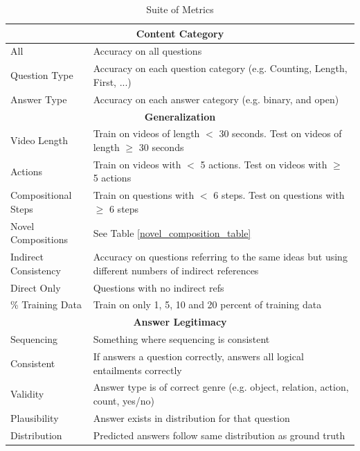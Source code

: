\documentclass[10pt,twocolumn,letterpaper]{article}
\begin{document}
\begin{table}[]
    \begin{center}
    \caption{Suite of Metrics}
    \label{metrics}
    \begin{tabular}{|p{2cm}|p{5cm}|}
     \hline
     \multicolumn{2}{|c|}{\textbf{Content Category}}\\
    \hline
    All & Accuracy on all questions\\
    \hline
    Question Type & Accuracy on each question category (e.g. Counting, Length, First, ...)\\
    \hline
    Answer Type & Accuracy on each answer category (e.g. binary, and open)\\
    \hline
    
    
     \multicolumn{2}{|c|}{\textbf{Generalization}}\\
    \hline
    Video Length & Train on videos of length $<$ 30 seconds. Test on videos of length $\geq$ 30 seconds \\
    \hline
    Actions & Train on videos with $<$ 5 actions. Test on videos with $\geq$ 5 actions  \\
    \hline
    Compositional Steps &  Train on questions with $<$ 6 steps. Test on questions with $\geq$ 6 steps  \\
    \hline
    Novel Compositions & See Table \ref{novel_composition_table} \\
    \hline
    Indirect Consistency & Accuracy on questions referring to the same ideas but using different numbers of indirect references\\
    \hline
    Direct Only & Questions with no indirect refs\\
    \hline
    \% Training Data & Train on only 1, 5, 10 and 20 percent of training data \\
    \hline
    
    
     \multicolumn{2}{|c|}{\textbf{Answer Legitimacy}}\\
    \hline
    Sequencing & Something where sequencing is consistent \\
    \hline
    Consistent & If answers a question correctly, answers all logical entailments correctly \\
    \hline
    Validity & Answer type is of correct genre (e.g. object, relation, action, count, yes/no)\\
    \hline
    Plausibility  & Answer exists in distribution for that question\\
    \hline
    Distribution & Predicted answers follow same distribution as ground truth\\
    \hline
    \end{tabular}
    \end{center}
\end{table}
\end{document}
